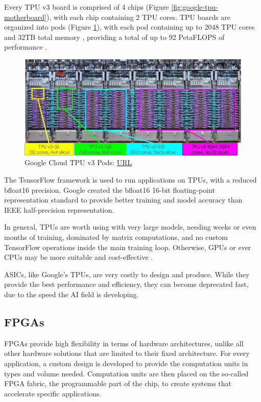 Every TPU v3 board is comprised of 4 chips (Figure \ref{fig:google-tpu-motherboard}), with each chip containing 2 TPU cores. TPU boards are organized into pods (Figure \ref{fig:tpu-v3-pods}), with each pod containing up to 2048 TPU cores and 32TB total memory \cite{Google-Cloud-TPU}, providing a total of up to 92 PetaFLOPS of performance \cite{Tensor-Processing-Unit-Wikipedia}.

\begin{figure} [H]
	\centering
	\includegraphics[width=\textwidth]{Images/Hardware/tpu-v3-pods.png}
	\decoRule
	\caption[Google Cloud TPU v3 Pods]{Google Cloud TPU v3 Pods: \href{https://cloud.google.com/tpu/docs/system-architecture}{URL}}
	\label{fig:tpu-v3-pods}
\end{figure}

The TensorFlow framework is used to run applications on TPUs, with a reduced bfloat16 precision. Google created the bfloat16 16-bit floating-point representation standard to provide better training and model accuracy than IEEE half-precision representation.

In general, TPUs are worth using with very large models, needing weeks or even months of training, dominated by matrix computations, and no custom TensorFlow operations inside the main training loop. Otherwise, GPUs or ever CPUs may be more suitable and cost-effective \cite{Cloud-Tensor-Processing-Units}.

ASICs, like Google's TPUs, are very costly to design and produce. While they provide the best performance and efficiency, they can become deprecated fast, due to the speed the AI field is developing.

\subsection{FPGAs}
FPGAs provide high flexibility in terms of hardware architectures, unlike all other hardware solutions that are limited to their fixed architecture. For every application, a custom design is developed to provide the computation units in types and volume needed. Computation units are then placed on the so-called FPGA fabric, the programmable part of the chip, to create systems that accelerate specific applications.

